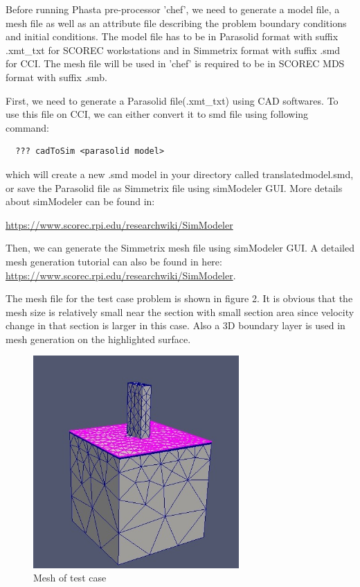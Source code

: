 \documentclass{article}
\begin{document}
Before running Phasta pre-processor 'chef', we need to generate a model file, a mesh file as well as an attribute file describing the problem boundary conditions and initial conditions.
The model file has to be in Parasolid format with suffix .xmt\_txt for SCOREC workstations and in Simmetrix format with suffix .smd for CCI. The mesh file will be used in 'chef' is required to be in SCOREC MDS format with suffix .smb.

First, we need to generate a Parasolid file(.xmt\_txt) using CAD softwares. To use this file on CCI, we can either convert it to smd file using following command:
  \begin{lstlisting}
  ??? cadToSim <parasolid model> 
  \end{lstlisting}
which will create a new .smd model in your directory called translatedmodel.smd, or save the Parasolid file as Simmetrix file using simModeler GUI. More details about simModeler can be found in:

\url{https://www.scorec.rpi.edu/researchwiki/SimModeler}

Then, we can generate the Simmetrix mesh file using simModeler GUI. A detailed mesh generation tutorial can also be found in here:\\
\url{https://www.scorec.rpi.edu/researchwiki/SimModeler}.

The mesh file for the test case problem is shown in figure 2. It is obvious that the mesh size is relatively small near the section with small section area since velocity change in that section is larger in this case. Also a 3D boundary layer is used in mesh generation on the highlighted surface. 
\begin{figure}[h!]
  \centering
    \includegraphics[width=0.7\textwidth]{fig2}
  \caption{Mesh of test case}
\end{figure}
\end{document}
